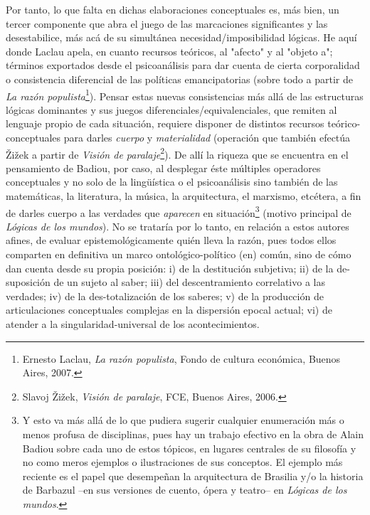 Por tanto, lo que falta en dichas elaboraciones conceptuales es, más
bien, un tercer componente que abra el juego de las marcaciones
significantes y las desestabilice, más acá de su simultánea
necesidad/imposibilidad lógicas. He aquí donde Laclau apela, en cuanto
recursos teóricos, al "afecto" y al "objeto a"; términos exportados
desde el psicoanálisis para dar cuenta de cierta corporalidad o
consistencia diferencial de las políticas emancipatorias (sobre todo a
partir de \emph{La razón populista}\footnote{Ernesto Laclau, \emph{La
  razón populista}, Fondo de cultura económica, Buenos Aires, 2007.}).
Pensar estas nuevas consistencias más allá de las estructuras lógicas
dominantes y sus juegos diferenciales/equivalenciales, que remiten al
lenguaje propio de cada situación, requiere disponer de distintos
recursos teórico-conceptuales para darles \emph{cuerpo} y
\emph{materialidad} (operación que también efectúa Žižek a partir de
\emph{Visión de paralaje}\footnote{Slavoj Žižek, \emph{Visión de
  paralaje}, FCE, Buenos Aires, 2006.}). De allí la riqueza que se
encuentra en el pensamiento de Badiou, por caso, al desplegar éste
múltiples operadores conceptuales y no solo de la lingüística o el
psicoanálisis sino también de las matemáticas, la literatura, la música,
la arquitectura, el marxismo, etcétera, a fin de darles cuerpo a las
verdades que \emph{aparecen} en situación\footnote{Y esto va más allá de
  lo que pudiera sugerir cualquier enumeración más o menos profusa de
  disciplinas, pues hay un trabajo efectivo en la obra de Alain Badiou
  sobre cada uno de estos tópicos, en lugares centrales de su filosofía
  y no como meros ejemplos o ilustraciones de sus conceptos. El ejemplo
  más reciente es el papel que desempeñan la arquitectura de Brasilia
  y/o la historia de Barbazul --en sus versiones de cuento, ópera y
  teatro-- en \emph{Lógicas de los mundos}.} (motivo principal de
\emph{Lógicas de los mundos}). No se trataría por lo tanto, en relación
a estos autores afines, de evaluar epistemológicamente quién lleva la
razón, pues todos ellos comparten en definitiva un marco
ontológico-político (en) común, sino de cómo dan cuenta desde su propia
posición: i) de la destitución subjetiva; ii) de la de-suposición de un
sujeto al saber; iii) del descentramiento correlativo a las verdades;
iv) de la des-totalización de los saberes; v) de la producción de
articulaciones conceptuales complejas en la dispersión epocal actual;
vi) de atender a la singularidad-universal de los acontecimientos.

